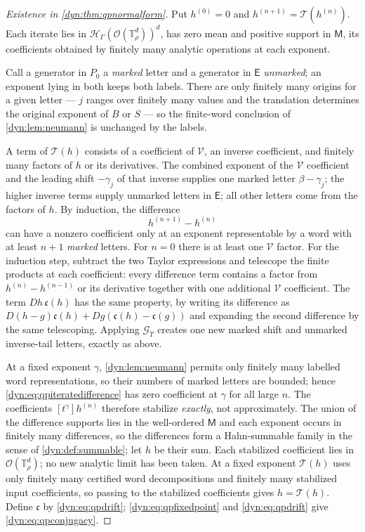 \documentclass[11pt,letterpaper]{article}
\theoremstyle{definition}
\theoremstyle{remark}
\newcommand{\HH}{\mathscr H}
\newcommand{\OO}{\mathcal O}
\newcommand{\TT}{\mathbb T}
\newcommand{\strip}{\OO(\TT^{d}_{\rho})}
\newcommand{\Gups}{\mathcal G_{\Upsilon}}
\numberwithin{equation}{section}
\begin{document}
\begin{proof}[Existence in \cref{dyn:thm:qpnormalform}]
Put $h^{(0)}=0$ and $h^{(n+1)}=\mathcal T(h^{(n)})$. Each iterate lies in
$\HH_\Gamma(\strip)^{d}$, has zero mean and positive support in
$\mathsf M$, its coefficients obtained by finitely many analytic operations
at each exponent.

Call a generator in $P_0$ a \emph{marked} letter and a generator in
$\mathsf E$ \emph{unmarked}; an exponent lying in both keeps both labels.
There are only finitely many origins for a given letter --- $j$ ranges over
finitely many values and the translation determines the original exponent
of $B$ or $S$ --- so the finite-word conclusion of \cref{dyn:lem:neumann}
is unchanged by the labels.

A term of $\mathcal T(h)$ consists of a coefficient of $\mathcal V$, an
inverse coefficient, and finitely many factors of $h$ or its derivatives.
The combined exponent of the $\mathcal V$ coefficient and the leading shift
$-\gamma_j$ of that inverse supplies one marked letter $\beta-\gamma_j$;
the higher inverse terms supply unmarked letters in $\mathsf E$; all other
letters come from the factors of $h$. By induction, the difference
\begin{equation}\label{dyn:eq:qpiteratedifference}
 h^{(n+1)}-h^{(n)}
\end{equation}
can have a nonzero coefficient only at an exponent representable by a word
with at least $n+1$ \emph{marked} letters. For $n=0$ there is at least one
$\mathcal V$ factor. For the induction step, subtract the two Taylor
expressions and telescope the finite products at each coefficient: every
difference term contains a factor from $h^{(n)}-h^{(n-1)}$ or its
derivative together with one additional $\mathcal V$ coefficient. The term
$Dh\,\mathfrak c(h)$ has the same property, by writing its difference as
$D(h-g)\mathfrak c(h)+Dg(\mathfrak c(h)-\mathfrak c(g))$ and expanding the
second difference by the same telescoping. Applying $\Gups$ creates one new
marked shift and unmarked inverse-tail letters, exactly as above.

At a fixed exponent $\gamma$, \cref{dyn:lem:neumann} permits only finitely
many labelled word representations, so their numbers of marked letters are
bounded; hence \eqref{dyn:eq:qpiteratedifference} has zero coefficient at
$\gamma$ for all large $n$. The coefficients $[t^{\gamma}]h^{(n)}$
therefore stabilize \emph{exactly}, not approximately. The union of the
difference supports lies in the well-ordered $\mathsf M$ and each exponent
occurs in finitely many differences, so the differences form a
Hahn-summable family in the sense of \cref{dyn:def:summable}; let $h$ be
their sum. Each stabilized coefficient lies in $\strip$; no new analytic
limit has been taken. At a fixed exponent $\mathcal T(h)$ uses only
finitely many certified word decompositions and finitely many stabilized
input coefficients, so passing to the stabilized coefficients gives
$h=\mathcal T(h)$. Define $\mathfrak c$ by \eqref{dyn:eq:qpdrift};
\eqref{dyn:eq:qpfixedpoint} and \eqref{dyn:eq:qpdrift} give
\eqref{dyn:eq:qpconjugacy}.


\end{proof}
\end{document}
